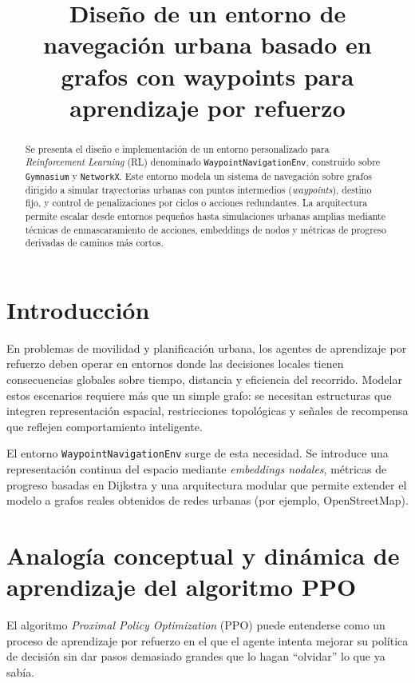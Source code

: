 \documentclass[11pt,a4paper]{article}
\title{\textbf{Diseño de un entorno de navegación urbana basado en grafos con waypoints para aprendizaje por refuerzo}}
\date{}
\begin{document}
\maketitle

\begin{abstract}
Se presenta el diseño e implementación de un entorno personalizado para \textit{Reinforcement Learning} (RL) denominado \texttt{WaypointNavigationEnv}, construido sobre \texttt{Gymnasium} y \texttt{NetworkX}. Este entorno modela un sistema de navegación sobre grafos dirigido a simular trayectorias urbanas con puntos intermedios (\textit{waypoints}), destino fijo, y control de penalizaciones por ciclos o acciones redundantes. La arquitectura permite escalar desde entornos pequeños hasta simulaciones urbanas amplias mediante técnicas de enmascaramiento de acciones, embeddings de nodos y métricas de progreso derivadas de caminos más cortos.
\end{abstract}

\section{Introducción}

En problemas de movilidad y planificación urbana, los agentes de aprendizaje por refuerzo deben operar en entornos donde las decisiones locales tienen consecuencias globales sobre tiempo, distancia y eficiencia del recorrido. Modelar estos escenarios requiere más que un simple grafo: se necesitan estructuras que integren representación espacial, restricciones topológicas y señales de recompensa que reflejen comportamiento inteligente.

El entorno \texttt{WaypointNavigationEnv} surge de esta necesidad. Se introduce una representación continua del espacio mediante \textit{embeddings nodales}, métricas de progreso basadas en Dijkstra y una arquitectura modular que permite extender el modelo a grafos reales obtenidos de redes urbanas (por ejemplo, OpenStreetMap).

\section{Analogía conceptual y dinámica de aprendizaje del algoritmo PPO}

El algoritmo \textit{Proximal Policy Optimization} (PPO) puede entenderse como un proceso de aprendizaje por refuerzo en el que el agente intenta mejorar su política de decisión sin dar pasos demasiado grandes que lo hagan “olvidar” lo que ya sabía.
\end{document}
